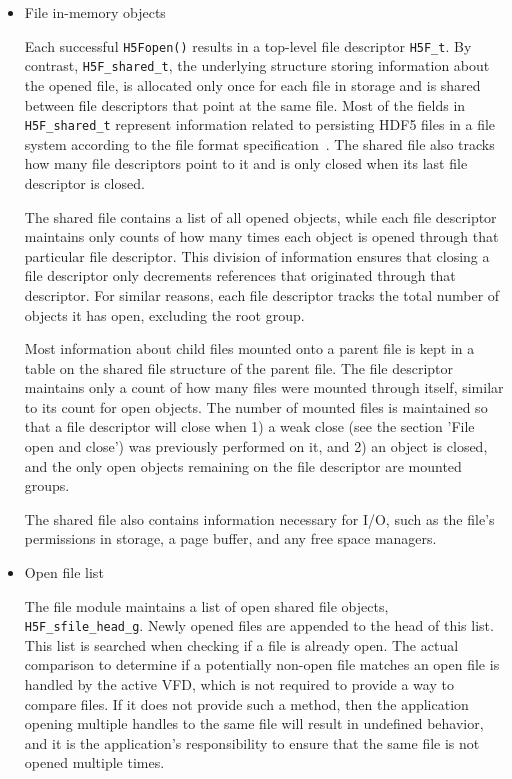 \begin{itemize}
    \item File in-memory objects

Each successful \texttt{H5Fopen()} results in a top-level file descriptor \texttt{H5F\_t}. By contrast, \texttt{H5F\_shared\_t}, the underlying structure storing information about the opened file, is allocated only once for each file in storage and is shared between file descriptors that point at the same file. Most of the fields in \texttt{H5F\_shared\_t} represent information related to persisting HDF5 files in a file system according to the file format specification~\cite{ffmt}. The shared file also tracks how many file descriptors point to it and is only closed when its last file descriptor is closed.

The shared file contains a list of all opened objects, while each file descriptor maintains only counts of how many times each object is opened through that particular file descriptor. This division of information ensures that closing a file descriptor only decrements references that originated through that descriptor. For similar reasons, each file descriptor tracks the total number of objects it has open, excluding the root group.

Most information about child files mounted onto a parent file is kept in a table on the shared file structure of the parent file. The file descriptor maintains only a count of how many files were mounted through itself, similar to its count for open objects. The number of mounted files is maintained so that a file descriptor will close when 1) a weak close (see the section 'File open and close') was previously performed on it, and 2) an object is closed, and the only open objects remaining on the file descriptor are mounted groups. 

The shared file also contains information necessary for I/O, such as the file's permissions in storage, a page buffer, and any free space managers.

 \item Open file list

The file module maintains a list of open shared file objects, \texttt{H5F\_sfile\_head\_g}. Newly opened files are appended to the head of this list. This list is searched when checking if a file is already open. The actual comparison to determine if a potentially non-open file matches an open file is handled by the active VFD, which is not required to provide a way to compare files. If it does not provide such a method, then the application opening multiple handles to the same file will result in undefined behavior, and it is the application's responsibility to ensure that the same file is not opened multiple times.


\end{itemize}
